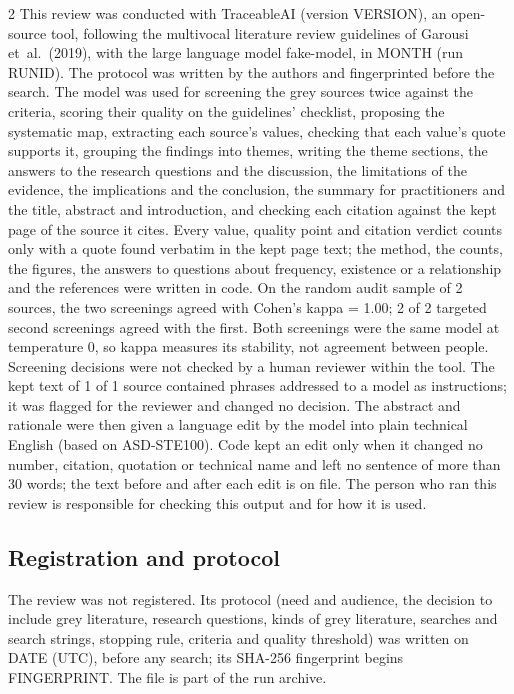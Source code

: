 \documentclass[10pt,a4paper]{article}
\begin{document}
\begin{multicols*}{2}
This review was conducted with TraceableAI (version VERSION), an open-source tool, following the multivocal literature review guidelines of Garousi et~al.\ (2019), with the large language model fake-model, in MONTH (run RUNID).
The protocol was written by the authors and fingerprinted before the search.
The model was used for screening the grey sources twice against the criteria, scoring their quality on the guidelines' checklist, proposing the systematic map, extracting each source's values, checking that each value's quote supports it, grouping the findings into themes, writing the theme sections, the answers to the research questions and the discussion, the limitations of the evidence, the implications and the conclusion, the summary for practitioners and the title, abstract and introduction, and checking each citation against the kept page of the source it cites.
Every value, quality point and citation verdict counts only with a quote found verbatim in the kept page text; the method, the counts, the figures, the answers to questions about frequency, existence or a relationship and the references were written in code.
On the random audit sample of 2 sources, the two screenings agreed with Cohen's kappa = 1.00; 2 of 2 targeted second screenings agreed with the first.
Both screenings were the same model at temperature 0, so kappa measures its stability, not agreement between people.
Screening decisions were not checked by a human reviewer within the tool.
The kept text of 1 of 1 source contained phrases addressed to a model as instructions; it was flagged for the reviewer and changed no decision.
The abstract and rationale were then given a language edit by the model into plain technical English (based on ASD-STE100).
Code kept an edit only when it changed no number, citation, quotation or technical name and left no sentence of more than 30 words; the text before and after each edit is on file.
The person who ran this review is responsible for checking this output and for how it is used.

\subsection{Registration and protocol}\label{sec:registration-and-protocol}

The review was not registered.
Its protocol (need and audience, the decision to include grey literature, research questions, kinds of grey literature, searches and search strings, stopping rule, criteria and quality threshold) was written on DATE (UTC), before any search; its SHA-256 fingerprint begins FINGERPRINT.
The file is part of the run archive.


\end{multicols*}
\end{document}
